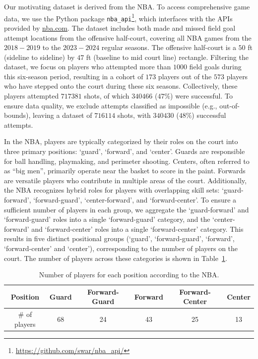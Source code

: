 \documentclass[USenglish]{article}
\theoremstyle{dgthm}
\theoremstyle{dgdef}
\begin{document}
Our motivating dataset is derived from the NBA. To access comprehensive game data, we use the Python package \texttt{nba\_api}\footnote{\url{https://github.com/swar/nba_api/}}, which interfaces with the APIs provided by \url{nba.com}. The dataset includes both made and missed field goal attempt locations from the offensive half-court, covering all NBA games from the $2018-2019$ to the $2023-2024$ regular seasons. The offensive half-court is a $50$ ft (sideline to sideline) by $47$ ft (baseline to mid court line) rectangle. Filtering the dataset, we focus on players who attempted more than $1000$ field goals during this six-season period, resulting in a cohort of $173$ players out of the $573$ players who have stepped onto the court during these six seasons. Collectively, these players attempted $717381$ shots, of which $340466$ ($47\%$) were successful. To ensure data quality, we exclude attempts classified as impossible (e.g., out-of-bounds), leaving a dataset of $716114$ shots, with $340430$ ($48\%$) successful attempts.


In the NBA, players are typically categorized by their roles on the court into three primary positions: `guard', `forward', and `center'. Guards are responsible for ball handling, playmaking, and perimeter shooting. Centers, often referred to as ``big men'', primarily operate near the basket to score in the paint. Forwards are versatile players who contribute in multiple areas of the court. Additionally, the NBA recognizes hybrid roles for players with overlapping skill sets: `guard-forward', `forward-guard', `center-forward', and `forward-center'. To ensure a sufficient number of players in each group, we aggregate the `guard-forward' and `forward-guard' roles into a single `forward-guard' category, and the `center-forward' and `forward-center' roles into a single `forward-center' category. This results in five distinct positional groups (`guard', `forward-guard', `forward', `forward-center' and `center'), corresponding to the number of players on the court. The number of players across these categories is shown in Table~\ref{tab:player_position}.
\begin{table}
	\centering
	\caption{Number of players for each position according to the NBA.}
	\label{tab:player_position}
	\begin{tabular}{ c|ccccc }
		Position      & Guard & Forward-Guard & Forward & Forward-Center & Center \\
		\hline
		\# of players & 68    & 24            & 43      & 25             & 13     \\
	\end{tabular}
\end{table}
\end{document}
